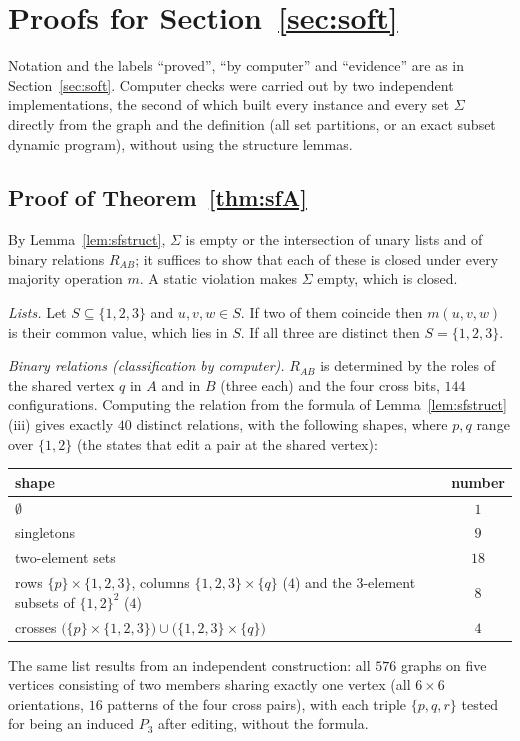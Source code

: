 \section{Proofs for Section~\ref{sec:soft}}\label{app:soft}
Notation and the labels ``proved'', ``by computer'' and ``evidence'' are as in Section~\ref{sec:soft}. Computer checks were carried out by two independent implementations, the second of which built every instance and every set $\Sigma$ directly from the graph and the definition (all set partitions, or an exact subset dynamic program), without using the structure lemmas.

\subsection{Proof of Theorem~\ref{thm:sfA}}\label{app:softA}
By Lemma~\ref{lem:sfstruct}, $\Sigma$ is empty or the intersection of unary lists and of binary relations $R_{AB}$; it suffices to show that each of these is closed under every majority operation $m$. A static violation makes $\Sigma$ empty, which is closed.

\emph{Lists.} Let $S\subseteq\{1,2,3\}$ and $u,v,w\in S$. If two of them coincide then $m(u,v,w)$ is their common value, which lies in $S$. If all three are distinct then $S=\{1,2,3\}$.

\emph{Binary relations (classification by computer).} $R_{AB}$ is determined by the roles of the shared vertex $q$ in $A$ and in $B$ (three each) and the four cross bits, $144$ configurations. Computing the relation from the formula of Lemma~\ref{lem:sfstruct}(iii) gives exactly $40$ distinct relations, with the following shapes, where $p,q$ range over $\{1,2\}$ (the states that edit a pair at the shared vertex):
\begin{center}
\begin{tabular}{@{}lc@{}}
shape & number\\\hline
$\emptyset$ & $1$\\
singletons & $9$\\
two-element sets & $18$\\
rows $\{p\}\times\{1,2,3\}$, columns $\{1,2,3\}\times\{q\}$ ($4$) and the $3$-element subsets of $\{1,2\}^2$ ($4$) & $8$\\
crosses $\bigl(\{p\}\times\{1,2,3\}\bigr)\cup\bigl(\{1,2,3\}\times\{q\}\bigr)$ & $4$
\end{tabular}
\end{center}
The same list results from an independent construction: all $576$ graphs on five vertices consisting of two members sharing exactly one vertex (all $6\times6$ orientations, $16$ patterns of the four cross pairs), with each triple $\{p,q,r\}$ tested for being an induced $P_3$ after editing, without the formula.

